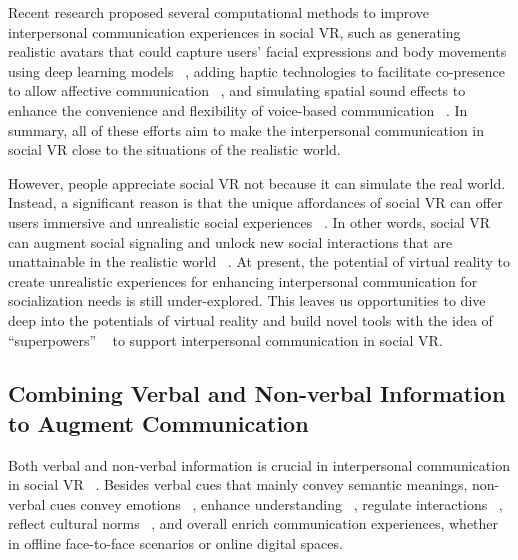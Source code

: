 Recent research proposed several computational methods to improve interpersonal communication experiences in social VR, such as generating realistic avatars that could capture users' facial expressions and body movements using deep learning models ~\cite{van2022deep}, adding haptic technologies to facilitate co-presence to allow affective communication ~\cite{fermoselle2020let, ahmed2016reach}, and simulating spatial sound effects to enhance the convenience and flexibility of voice-based communication ~\cite{yan2023conespeech}. 
In summary, all of these efforts aim to make the interpersonal communication in social VR close to the situations of the realistic world. 

However, people appreciate social VR not because it can simulate the real world. Instead, a significant reason is that 
the unique affordances of social VR can offer users immersive and unrealistic social experiences ~\cite{freeman2021body, maloney2020talking}. In other words, social VR can augment social signaling and unlock new social interactions that are unattainable in the realistic world ~\cite{mcveigh2022beyond, mcveigh2021case}.
At present, the potential of virtual reality to create unrealistic experiences for enhancing interpersonal communication for socialization needs is still under-explored. This leaves us opportunities to dive deep into the potentials of virtual reality and build novel tools with the idea of ``superpowers'' ~\cite{mcveigh2022beyond, mcveigh2021case} to support interpersonal communication in social VR.



\subsection{Combining Verbal and Non-verbal Information to Augment Communication}
Both verbal and non-verbal information is crucial in interpersonal communication in social VR ~\cite{palmer1995interpersonal}.
Besides verbal cues that mainly convey semantic meanings, non-verbal cues convey emotions ~\cite{liebman2016s, luo2024emotion}, enhance understanding ~\cite{aburumman2022nonverbal}, regulate interactions ~\cite{maloney2020talking}, reflect cultural norms ~\cite{freeman2021hugging}, and overall enrich communication experiences, whether in offline face-to-face scenarios or online digital spaces.

